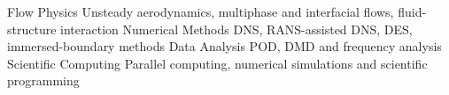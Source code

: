 

\begin{cvskills}

  \cvskill
  {Flow Physics} %
  {Unsteady aerodynamics, multiphase and interfacial flows, fluid-structure interaction} %
  \cvskill
  {Numerical Methods} %
  {DNS, RANS-assisted DNS, DES, immersed-boundary methods} %
  \cvskill
  {Data Analysis} %
  {POD, DMD and frequency analysis} %
  \cvskill
  {Scientific Computing} %
  {Parallel computing, numerical simulations and scientific programming} %

\end{cvskills}

